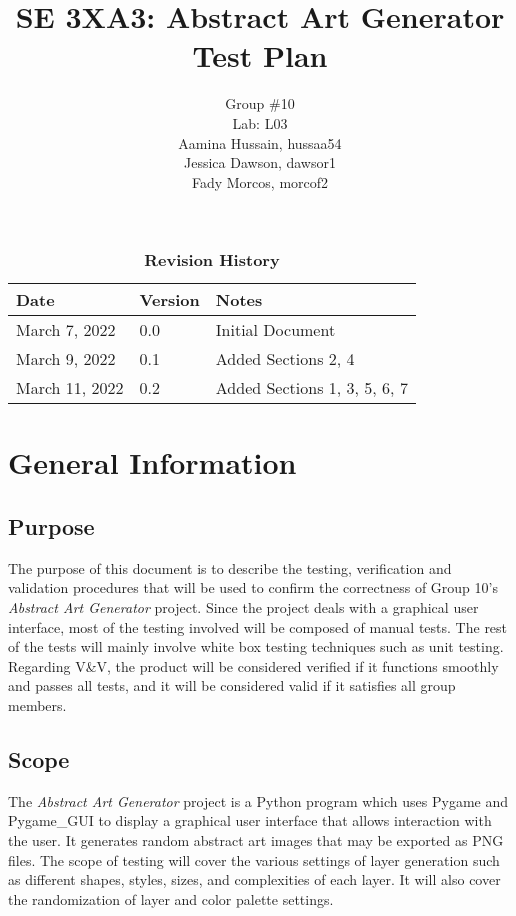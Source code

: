 \documentclass[12pt, titlepage]{article}
\title{SE 3XA3: Abstract Art Generator Test Plan}
\author{Group \#10
        \\Lab: L03
		\\ Aamina Hussain, hussaa54
		\\ Jessica Dawson, dawsor1
		\\ Fady Morcos, morcof2
}
\date{}
\begin{document}
\maketitle

\tableofcontents
\listoftables
\listoffigures

\begin{table}[bp]
\caption{\bf Revision History}
\begin{tabularx}{\textwidth}{p{3cm}p{2cm}X}
\toprule {\bf Date} & {\bf Version} & {\bf Notes}\\
\midrule
March 7, 2022 & 0.0 & Initial Document\\
March 9, 2022 & 0.1 & Added Sections 2, 4\\
March 11, 2022 & 0.2 & Added Sections 1, 3, 5, 6, 7\\
\bottomrule
\end{tabularx}
\end{table}

\newpage


\section{General Information}

\subsection{Purpose}

The purpose of this document is to describe the testing, verification and validation procedures that will be used to confirm the correctness of Group 10's \emph{Abstract Art Generator} project. Since the project deals with a graphical user interface, most of the testing involved will be composed of manual tests. The rest of the tests will mainly involve white box testing techniques such as unit testing. Regarding V\&V, the product will be considered verified if it functions smoothly and passes all tests, and it will be considered valid if it satisfies all group members.

\subsection{Scope}

The \emph{Abstract Art Generator} project is a Python program which uses Pygame and Pygame\_GUI to display a graphical user interface that allows interaction with the user. It generates random abstract art images that may be exported as PNG files. The scope of testing will cover the various settings of layer generation such as different shapes, styles, sizes, and complexities of each layer. It will also cover the randomization of layer and color palette settings.
\end{document}
